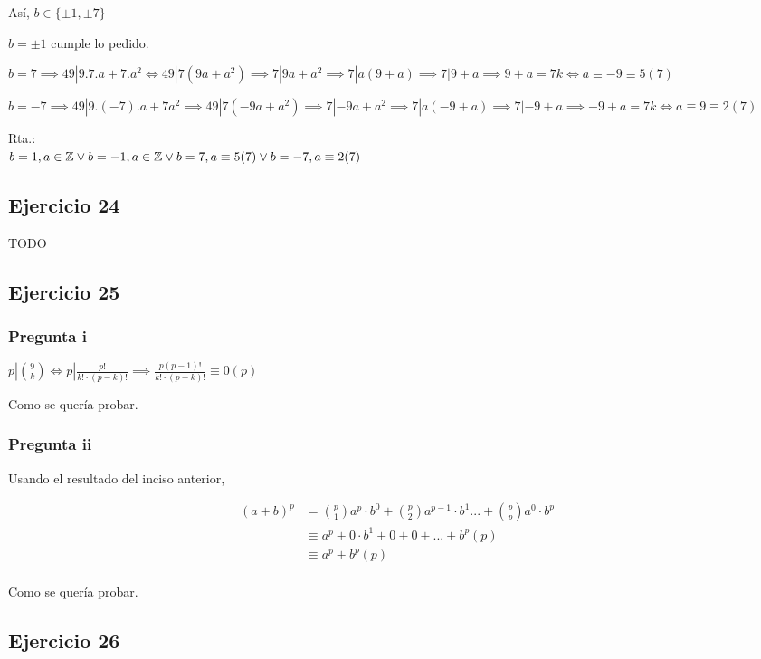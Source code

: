 Así, $ b \in \{ \pm 1, \pm 7 \} $

$ b = \pm 1 $ cumple lo pedido.

$ b = 7 \implies 49|9.7.a+7.a^2 \iff 49|7(9a+a^2) \implies 7|9a+a^2 \implies 7|a(9+a) \implies 7|9+a 
\implies 9+a = 7k \iff a \equiv -9 \equiv 5(7) $

$ b = -7 \implies 49|9.(-7).a+7a^2 \implies 49|7(-9a+a^2) \implies 7|-9a+a^2 \implies 7|a(-9+a) \implies 7|-9+a 
\implies -9+a = 7k \iff a \equiv 9 \equiv 2 (7)$

Rta.: \\
$b = 1, a \in \mathbb{Z} \vee \\b = -1, a \in \mathbb{Z} \vee \\b = 7, a \equiv 5(7) \vee \\b = -7, a \equiv 2(7)$

\subsection{Ejercicio 24}
TODO

\subsection{Ejercicio 25}
\subsubsection{Pregunta i}
$ p|\binom{9}{k} \iff p|\frac{p!}{k! \cdot (p-k)!} \implies \frac{p(p-1)!}{k! \cdot (p-k)!} \equiv 0(p)$

Como se quería probar.

\subsubsection{Pregunta ii}
Usando el resultado del inciso anterior,

\begin{align*}
    (a+b)^p &= \binom{p}{1}a^p \cdot b^0 + \binom{p}{2}a^{p-1} \cdot b^1 ... + \binom{p}{p}a^0 \cdot b^p \\
    &\equiv a^p + 0 \cdot b^1 + 0 + 0 + ... + b^p (p) \\
    &\equiv a^p + b^p (p)\\
\end{align*}

Como se quería probar.

\subsection{Ejercicio 26}

